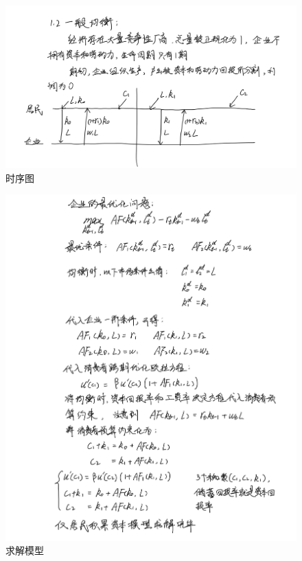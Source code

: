 \documentclass[UTF8]{article}
\begin{document}
        \begin{figure}[H]
            \centering
            \includegraphics[width = 1 \textwidth]{仅居民积累资本3.png}
            \caption{时序图}
        \end{figure}
        \begin{figure}[H]
            \centering
            \includegraphics[width = 1 \textwidth]{仅居民积累资本4.png}
            \caption{求解模型}
        \end{figure}
\end{document}
